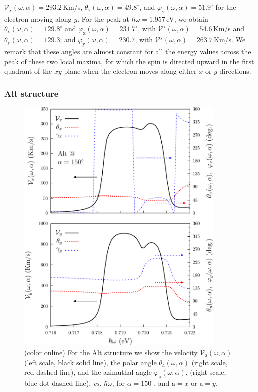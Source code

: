 \documentclass[floatfix,prb,aps,superscriptaddress,showpacs,11pt,preprint,letterpaper]{revtex4}
\def\tama{10cm}
\begin{document}
$\mathcal{V}_{\mathrm{y}} (\omega,\alpha)=293.2$\,Km/s, $\theta_{\mathrm{y}}
(\omega,\alpha)=49.8^{\circ}$, and $\varphi_{\mathrm{y}}
(\omega,\alpha)=51.9^{\circ}$ for the electron moving along $y$. For the peak
at $\hbar\omega=1.957$\,eV, we obtain $\theta_{\mathrm{x}} (\omega,\alpha) =
129.8^{\circ}$ and $\varphi_{\mathrm{x}} (\omega,\alpha) = 231.7^{\circ}$, with
$\mathcal{V}^{\mathrm{x}} (\omega,\alpha) = 54.6$\,Km/s and
$\theta_{\mathrm{y}}(\omega,\alpha) =129.3$; and
$\varphi_{\mathrm{y}}(\omega,\alpha) = 230.7$, with $\mathcal{V}^{\mathrm{y}}
(\omega,\alpha) = 263.7$\,Km/s. We remark that these angles are almost constant
for all the energy values across the peak of these two local maxima, for which
the spin is directed upward in the first quadrant of the $xy$ plane when
the electron moves along either $x$ or
$y$ directions.

\subsubsection{Alt structure}

\begin{figure}[tb]
\centering
\includegraphics[width=\tama]{fig9}
\caption{(color online) For the Alt structure we show  the velocity
$\mathcal{V}_{\mathrm{a}} (\omega,\alpha)$ (left scale, black solid line), the polar
angle $\theta_{\mathrm{a}} (\omega,\alpha)$ (right scale, red dashed  line), and the
azimuthal angle $\varphi_{\mathrm{a}} (\omega,\alpha)$, (right scale, blue dot-dashed 
line), {\it vs.} $\hbar\omega$, for $\alpha=150^\circ$, and $\mathrm{a}=x$ or
$\mathrm{a}=y$. }
\label{fig:alt-vx-vy-w1}
\end{figure}
\end{document}
